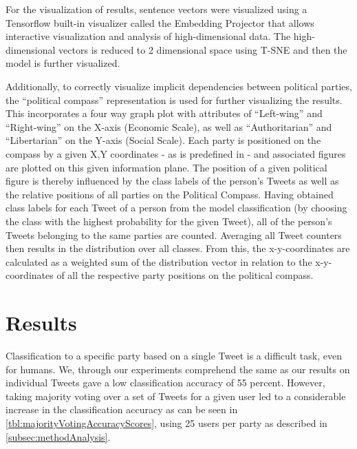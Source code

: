 \documentclass[10pt, oneside]{article}
\begin{document}
\begin{multicols}{2}
For the visualization of results, sentence vectors were visualized using a Tensorflow built-in visualizer called the Embedding Projector that allows interactive visualization and analysis of high-dimensional data.
The high-dimensional vectors is reduced to 2 dimensional space using T-SNE and then the model is further visualized.

Additionally, to correctly visualize implicit dependencies between political parties, the ``political compass'' \cite{PoliticalCompass2017} representation is used for further visualizing the results. This incorporates a four way graph plot with attributes of ``Left-wing'' and ``Right-wing'' on the X-axis (Economic Scale), as well as ``Authoritarian'' and ``Libertarian'' on the Y-axis (Social Scale). Each party is positioned on the compass by a given X,Y coordinates - as is predefined in \cite{PoliticalCompass2017} - and associated figures are plotted on this given information plane.
The position of a given political figure is thereby influenced by the class labels of the person's Tweets as well as the relative positions of all parties on the Political Compass. Having obtained class labels for each Tweet of a person from the model classification (by choosing the class with the highest probability for the given Tweet), all of the person's Tweets belonging to the same parties are counted. Averaging all Tweet counters then results in the distribution over all classes. From this, the x-y-coordinates are calculated as a weighted sum of the distribution vector in relation to the x-y-coordinates of all the respective party positions on the political compass.


\section{Results}

Classification to a specific party based on a single Tweet is a difficult task, even for humans. We, through our experiments comprehend the same as our results on individual Tweets gave a low classification accuracy of 55 percent.
However, taking majority voting over a set of Tweets for a given user led to a considerable increase in the classification accuracy as can be seen in \autoref{tbl:majorityVotingAccuracyScores}, using 25 users per party as described in \autoref{subsec:methodAnalysis}.


\end{multicols}
\end{document}

